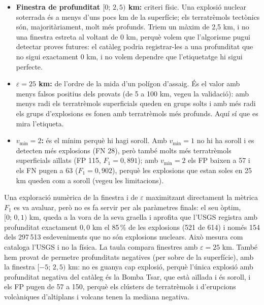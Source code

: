 \documentclass[a4paper,11pt]{article}
\begin{document}
\begin{itemize}
  \item \textbf{Finestra de profunditat $[0;\,2{,}5)$ km:} criteri físic. Una explosió nuclear soterrada és a menys d'uns
        pocs km de la superfície; els terratrèmols tectònics són, majoritàriament, molt més profunds. Triem un màxim de 2,5 km, i no
        una finestra estreta al voltant de 0 km, perquè volem que l'algorisme pugui detectar proves futures: el catàleg
        podria registrar-les a una profunditat que no sigui exactament 0 km, i no volem dependre que l'etiquetatge hi sigui
        perfecte.
  \item \textbf{$\varepsilon=25$ km:} de l'ordre de la mida d'un polígon d'assaig. És el valor amb menys falsos positius dels
        provats (de 5 a 100 km, vegeu la validació): amb menys radi els terratrèmols superficials queden en grups solts i amb
        més radi els grups d'explosions es fonen amb terratrèmols més profunds. Aquí sí que es mira l'etiqueta.
  \item \textbf{$v_{\min}=2$:} és el mínim perquè hi hagi soroll. Amb $v_{\min}=1$ no hi ha soroll i es detecten més explosions
        (FN 28), però també molts més terratrèmols superficials aïllats (FP 115, $F_1=0{,}891$); amb $v_{\min}=2$ els FP baixen a
        57 i els FN pugen a 63 ($F_1=0{,}902$), perquè les explosions que estan soles en 25 km queden com a soroll (vegeu les
        limitacions).
\end{itemize}
Una exploració numèrica de la finestra i de $\varepsilon$ maximitzant directament la mètrica $F_1$ es va avaluar, però no es fa servir per als paràmetres finals: el seu òptim, $[0;\,0{,}1)$ km, queda a la vora de la seva graella i aprofita que l'USGS registra amb
profunditat exactament $0{,}0$ km el 85\,\% de les explosions (521 de 614) i només 154 dels 297\,513 esdeveniments que no són
explosions nuclears. Això mesura com cataloga l'USGS i no la física. La taula compara finestres amb $\varepsilon=25$ km. També hem provat de permetre
profunditats negatives (per sobre de la superfície), amb la finestra $[-5;\,2{,}5)$ km: no es guanya cap explosió, perquè l'única
explosió amb profunditat negativa del catàleg és la Bomba Tsar, que està aïllada i és soroll, i els FP pugen de 57 a 150, perquè
els clústers de terratrèmols i d'erupcions volcàniques d'altiplans i volcans tenen la mediana negativa.
\end{document}
